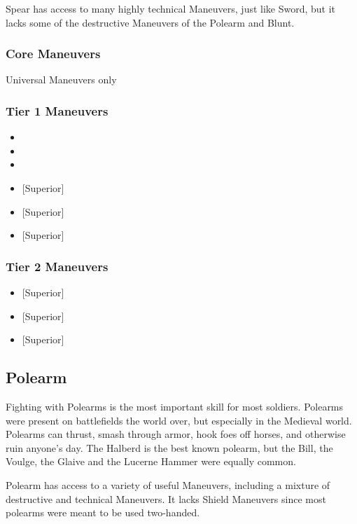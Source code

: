 \documentclass[oneside,11pt,english]{book}
\begin{document}
Spear has access to many highly technical Maneuvers, just like Sword, but it lacks some of the destructive Maneuvers of the Polearm and Blunt. 

\subsubsection{Core Maneuvers}
Universal Maneuvers only

\subsubsection{Tier 1 Maneuvers}
\vspace{-5pt}\begin{itemize}
  [itemsep=0.5mm]
\item {}
\item {}
\item {}
\item {} [Superior]
\item {} [Superior]
\item {} [Superior]
\end{itemize}
\subsubsection{Tier 2 Maneuvers}
\begin{itemize}
  [itemsep=0.5mm]
\item {} [Superior] 
\item {} [Superior] 
\item {} [Superior]
\end{itemize}
\subsection{Polearm}
Fighting with Polearms is the most important skill for most soldiers. Polearms were present on 
battlefields the world over, but especially in the Medieval world. Polearms can thrust, smash through 
armor, hook foes off horses, and otherwise ruin anyone’s day. The Halberd is the best known polearm, 
but the Bill, the Voulge, the Glaive and the Lucerne Hammer were equally common. 

Polearm has access to a variety of useful Maneuvers, including a mixture of destructive and technical 
Maneuvers. It lacks Shield Maneuvers since most polearms were meant to be used two-handed. 
\end{document}
